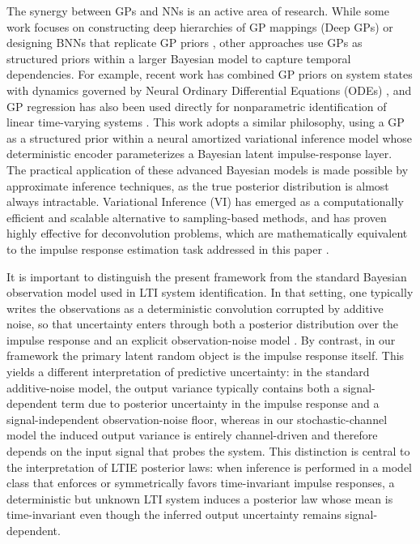 \documentclass[preprint,1p,times,authoryear]{elsarticle}
\begin{document}
The synergy between GPs and NNs is an active area of research. While some work focuses on constructing deep hierarchies of GP mappings (Deep GPs) \citep{Damianou2013} or designing BNNs that replicate GP priors \citep{Sendera2025}, other approaches use GPs as structured priors within a larger Bayesian model to capture temporal dependencies. For example, recent work has combined GP priors on system states with dynamics governed by Neural Ordinary Differential Equations (ODEs) \citep{Bhouri2022}, and GP regression has also been used directly for nonparametric identification of linear time-varying systems \citep{Hallemans2020}. This work adopts a similar philosophy, using a GP as a structured prior within a neural amortized variational inference model whose deterministic encoder parameterizes a Bayesian latent impulse-response layer. The practical application of these advanced Bayesian models is made possible by approximate inference techniques, as the true posterior distribution is almost always intractable. Variational Inference (VI) has emerged as a computationally efficient and scalable alternative to sampling-based methods, and has proven highly effective for deconvolution problems, which are mathematically equivalent to the impulse response estimation task addressed in this paper \citep{Zhang2013, Susik2023, Jospin2022}.

It is important to distinguish the present framework from the standard Bayesian observation model used in LTI system identification. In that setting, one typically writes the observations as a deterministic convolution corrupted by additive noise, so that uncertainty enters through both a posterior distribution over the impulse response and an explicit observation-noise model \citep{Pillonetto2023, Darwish2017}. By contrast, in our framework the primary latent random object is the impulse response itself. This yields a different interpretation of predictive uncertainty: in the standard additive-noise model, the output variance typically contains both a signal-dependent term due to posterior uncertainty in the impulse response and a signal-independent observation-noise floor, whereas in our stochastic-channel model the induced output variance is entirely channel-driven and therefore depends on the input signal that probes the system. This distinction is central to the interpretation of LTIE posterior laws: when inference is performed in a model class that enforces or symmetrically favors time-invariant impulse responses, a deterministic but unknown LTI system induces a posterior law whose mean is time-invariant even though the inferred output uncertainty remains signal-dependent.
\end{document}
